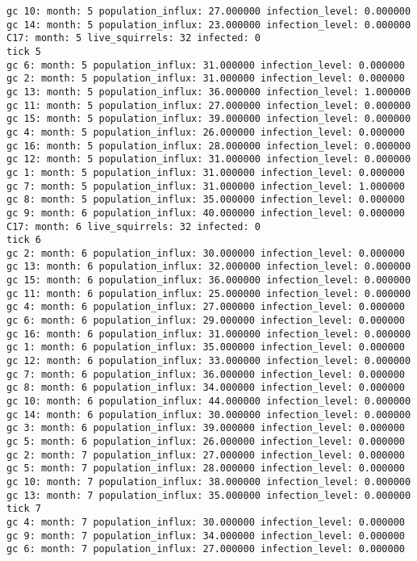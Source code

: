 \begin{lstlisting}[basicstyle=\tiny]
gc 10: month: 5 population_influx: 27.000000 infection_level: 0.000000
gc 14: month: 5 population_influx: 23.000000 infection_level: 0.000000
C17: month: 5 live_squirrels: 32 infected: 0
tick 5
gc 6: month: 5 population_influx: 31.000000 infection_level: 0.000000
gc 2: month: 5 population_influx: 31.000000 infection_level: 0.000000
gc 13: month: 5 population_influx: 36.000000 infection_level: 1.000000
gc 11: month: 5 population_influx: 27.000000 infection_level: 0.000000
gc 15: month: 5 population_influx: 39.000000 infection_level: 0.000000
gc 4: month: 5 population_influx: 26.000000 infection_level: 0.000000
gc 16: month: 5 population_influx: 28.000000 infection_level: 0.000000
gc 12: month: 5 population_influx: 31.000000 infection_level: 0.000000
gc 1: month: 5 population_influx: 31.000000 infection_level: 0.000000
gc 7: month: 5 population_influx: 31.000000 infection_level: 1.000000
gc 8: month: 5 population_influx: 35.000000 infection_level: 0.000000
gc 9: month: 6 population_influx: 40.000000 infection_level: 0.000000
C17: month: 6 live_squirrels: 32 infected: 0
tick 6
gc 2: month: 6 population_influx: 30.000000 infection_level: 0.000000
gc 13: month: 6 population_influx: 32.000000 infection_level: 0.000000
gc 15: month: 6 population_influx: 36.000000 infection_level: 0.000000
gc 11: month: 6 population_influx: 25.000000 infection_level: 0.000000
gc 4: month: 6 population_influx: 27.000000 infection_level: 0.000000
gc 6: month: 6 population_influx: 29.000000 infection_level: 0.000000
gc 16: month: 6 population_influx: 31.000000 infection_level: 0.000000
gc 1: month: 6 population_influx: 35.000000 infection_level: 0.000000
gc 12: month: 6 population_influx: 33.000000 infection_level: 0.000000
gc 7: month: 6 population_influx: 36.000000 infection_level: 0.000000
gc 8: month: 6 population_influx: 34.000000 infection_level: 0.000000
gc 10: month: 6 population_influx: 44.000000 infection_level: 0.000000
gc 14: month: 6 population_influx: 30.000000 infection_level: 0.000000
gc 3: month: 6 population_influx: 39.000000 infection_level: 0.000000
gc 5: month: 6 population_influx: 26.000000 infection_level: 0.000000
gc 2: month: 7 population_influx: 27.000000 infection_level: 0.000000
gc 5: month: 7 population_influx: 28.000000 infection_level: 0.000000
gc 10: month: 7 population_influx: 38.000000 infection_level: 0.000000
gc 13: month: 7 population_influx: 35.000000 infection_level: 0.000000
tick 7
gc 4: month: 7 population_influx: 30.000000 infection_level: 0.000000
gc 9: month: 7 population_influx: 34.000000 infection_level: 0.000000
gc 6: month: 7 population_influx: 27.000000 infection_level: 0.000000

\end{lstlisting}
